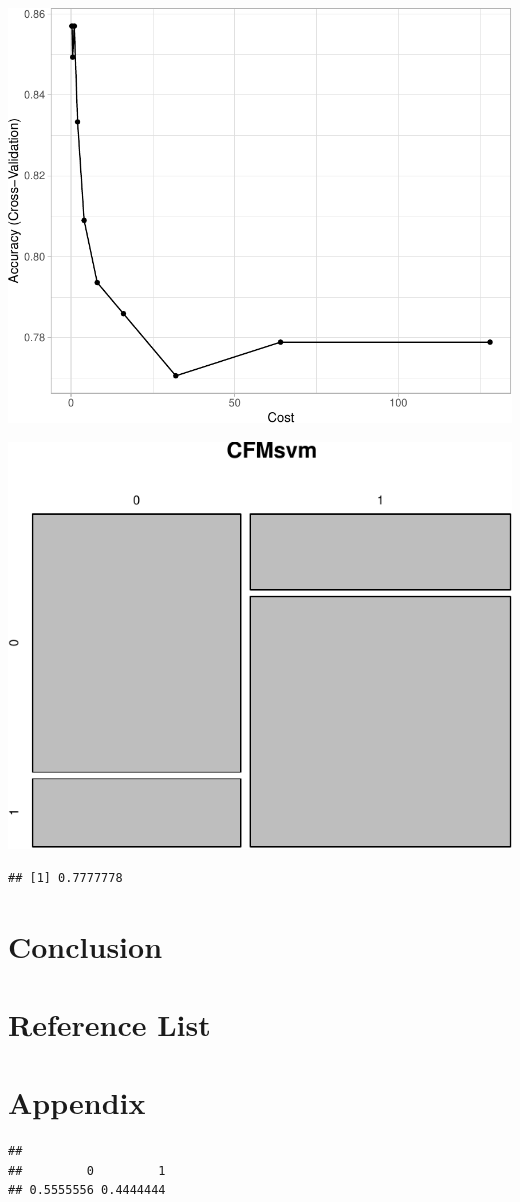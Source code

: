 \documentclass[11pt,preprint, authoryear]{elsarticle}
\numberwithin{equation}{section}
\numberwithin{figure}{section}
\numberwithin{table}{section}
\begin{document}
\includegraphics{ML_project_files/figure-latex/unnamed-chunk-19-1.pdf}

\includegraphics{ML_project_files/figure-latex/unnamed-chunk-21-1.pdf}

\begin{verbatim}
## [1] 0.7777778
\end{verbatim}

\hypertarget{conclusion}{%
\section{Conclusion}\label{conclusion}}

\hypertarget{reference-list}{%
\section{Reference List}\label{reference-list}}

\hypertarget{appendix}{%
\section{Appendix}\label{appendix}}

\begin{verbatim}
## 
##         0         1 
## 0.5555556 0.4444444
\end{verbatim}


\end{document}
